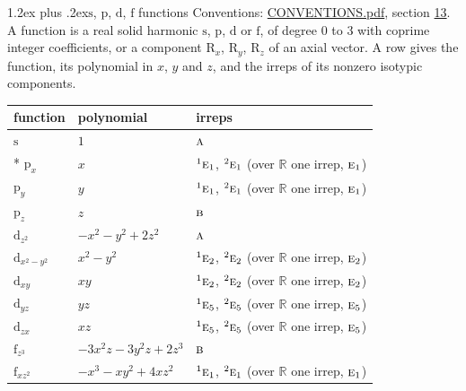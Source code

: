 \documentclass[10pt,a4paper]{article}
\makeatletter
\renewcommand\section{\@startsection{section}{1}{\z@}{-3ex plus -1ex minus -.2ex}%
  {1.2ex plus .2ex}{\normalfont\large\sffamily\bfseries\color{parttitle}}}
\numberwithin{equation}{section}
\newcommand{\irr}[1]{\text{\normalfont\scshape #1}}
\newcommand{\conjpair}[1]{{}^{#1}}
\newcommand{\orbital}[1]{\mathrm{#1}}
\makeatother
\begin{document}
\section{\texorpdfstring{$\orbital{s}$, $\orbital{p}$, $\orbital{d}$, $\orbital{f}$}{s, p, d, f} functions}\label{s:orbitals}
Conventions: \href{../../CONVENTIONS.pdf}{CONVENTIONS.pdf}, section \href{../../CONVENTIONS.pdf\#conv.13}{13}.
\leavevmode\label{n:head.function}A function is a real solid harmonic $\orbital{s}$, $\orbital{p}$, $\orbital{d}$ or $\orbital{f}$, of degree 0 to 3 with coprime integer coefficients, or a component $\orbital{R}_{x}$, $\orbital{R}_{y}$, $\orbital{R}_{z}$ of an axial vector. \label{n:head.polynomial}\label{n:head.irreps}A row gives the function, its polynomial in $x$, $y$ and $z$, and the irreps of its nonzero isotypic components.
{\small\begin{longtable}{@{}lll@{}}\toprule
function & polynomial & irreps\\\midrule\endhead
\bottomrule\endfoot\endlastfoot
$\orbital{s}$ & $1$ & $\irr{a}$\\*
$\orbital{p}_{x}$ & $x$ & $\conjpair{1}\irr{e}_{1}$, $\conjpair{2}\irr{e}_{1}$ (over $\mathbb{R}$ one irrep, $\irr{e}_{1}$)\\
$\orbital{p}_{y}$ & $y$ & $\conjpair{1}\irr{e}_{1}$, $\conjpair{2}\irr{e}_{1}$ (over $\mathbb{R}$ one irrep, $\irr{e}_{1}$)\\
$\orbital{p}_{z}$ & $z$ & $\irr{b}$\\
$\orbital{d}_{z^2}$ & $-x^{2} - y^{2} + 2z^{2}$ & $\irr{a}$\\
$\orbital{d}_{x^2-y^2}$ & $x^{2} - y^{2}$ & $\conjpair{1}\irr{e}_{2}$, $\conjpair{2}\irr{e}_{2}$ (over $\mathbb{R}$ one irrep, $\irr{e}_{2}$)\\
$\orbital{d}_{xy}$ & $xy$ & $\conjpair{1}\irr{e}_{2}$, $\conjpair{2}\irr{e}_{2}$ (over $\mathbb{R}$ one irrep, $\irr{e}_{2}$)\\
$\orbital{d}_{yz}$ & $yz$ & $\conjpair{1}\irr{e}_{5}$, $\conjpair{2}\irr{e}_{5}$ (over $\mathbb{R}$ one irrep, $\irr{e}_{5}$)\\
$\orbital{d}_{zx}$ & $xz$ & $\conjpair{1}\irr{e}_{5}$, $\conjpair{2}\irr{e}_{5}$ (over $\mathbb{R}$ one irrep, $\irr{e}_{5}$)\\
$\orbital{f}_{z^3}$ & $-3x^{2}z - 3y^{2}z + 2z^{3}$ & $\irr{b}$\\
$\orbital{f}_{xz^2}$ & $-x^{3} - xy^{2} + 4xz^{2}$ & $\conjpair{1}\irr{e}_{1}$, $\conjpair{2}\irr{e}_{1}$ (over $\mathbb{R}$ one irrep, $\irr{e}_{1}$)\\

\end{longtable}}
\end{document}
